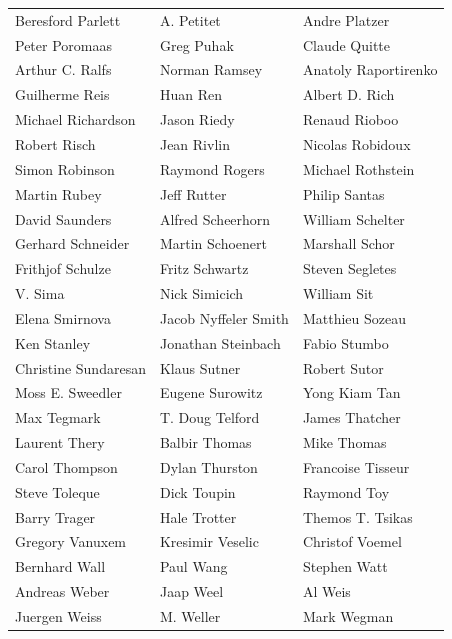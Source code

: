 \begin{tabular}{lll}
Beresford Parlett      & A. Petitet             & Andre Platzer\\
Peter Poromaas         & Greg Puhak             & Claude Quitte\\
Arthur C. Ralfs        & Norman Ramsey          & Anatoly Raportirenko\\
Guilherme Reis         & Huan Ren               & Albert D. Rich\\
Michael Richardson     & Jason Riedy            & Renaud Rioboo\\
Robert Risch           & Jean Rivlin            & Nicolas Robidoux\\
Simon Robinson         & Raymond Rogers         & Michael Rothstein\\
Martin Rubey           & Jeff Rutter            & Philip Santas\\
David Saunders         & Alfred Scheerhorn      & William Schelter\\
Gerhard Schneider      & Martin Schoenert       & Marshall Schor\\
Frithjof Schulze       & Fritz Schwartz         & Steven Segletes\\
V. Sima                & Nick Simicich          & William Sit\\
Elena Smirnova         & Jacob Nyffeler Smith   & Matthieu Sozeau\\
Ken Stanley            & Jonathan Steinbach     & Fabio Stumbo\\
Christine Sundaresan   & Klaus Sutner           & Robert Sutor\\
Moss E. Sweedler       & Eugene Surowitz        & Yong Kiam Tan\\
Max Tegmark            & T. Doug Telford        & James Thatcher\\
Laurent Thery          & Balbir Thomas          & Mike Thomas\\
Carol Thompson         & Dylan Thurston         & Francoise Tisseur\\
Steve Toleque          & Dick Toupin            & Raymond Toy\\
Barry Trager           & Hale Trotter           & Themos T. Tsikas\\
Gregory Vanuxem        & Kresimir Veselic       & Christof Voemel\\
Bernhard Wall          & Paul Wang              & Stephen Watt\\
Andreas Weber          & Jaap Weel              & Al Weis\\
Juergen Weiss          & M. Weller              & Mark Wegman\\

\end{tabular}
